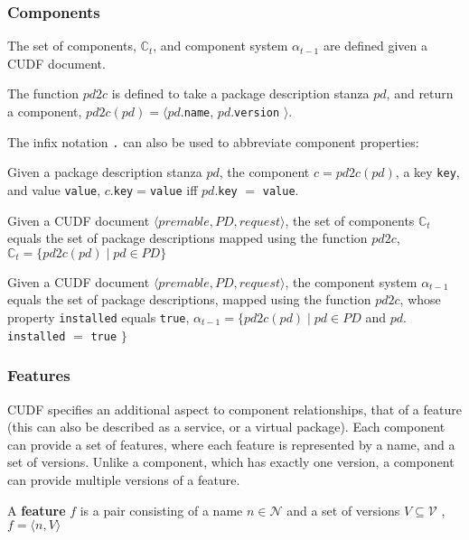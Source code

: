 \subsubsection{Components}
The set of components, $\mathbb{C}_t$, and component system $\alpha_{t-1}$ are defined given a CUDF document.

\begin{defs}
The function $pd2c$ is defined to take a package description stanza $pd$, and return a component, $pd2c(pd) = \langle pd.$\texttt{name}, $pd.$\texttt{version} $\rangle$.
\end{defs}

The infix notation \texttt{.} can also be used to abbreviate component properties: 
\begin{defs}
Given a package description stanza $pd$,  the component $c = pd2c(pd)$, a key \texttt{key}, and value \texttt{value}, 
$c$.\texttt{key}$ = $\texttt{value} iff $pd$.\texttt{key} $ = $ \texttt{value}.
\end{defs}

\begin{defs}
Given a CUDF document $\langle premable, PD, request \rangle$, the set of components $\mathbb{C}_t$ equals the set of package descriptions mapped using the function $pd2c$,
$\mathbb{C}_t = \{pd2c(pd) \mid pd \in PD\}$
\end{defs}

\begin{defs}
Given a CUDF document $\langle premable, PD, request \rangle$, the component system $\alpha_{t-1}$ equals the set of package descriptions, mapped using the function $pd2c$,
whose property \texttt{installed} equals \texttt{true},
$\alpha_{t-1} = \{pd2c(pd) \mid pd \in PD $ and $ pd.$\texttt{installed} $=$ \texttt{true} $\}$
\end{defs}

\subsubsection{Features}
CUDF specifies an additional aspect to component relationships, that of a feature (this can also be described as a service, or a virtual package).
Each component can provide a set of features, where each feature is represented by a name, and a set of versions.
Unlike a component, which has exactly one version, a component can provide multiple versions of a feature.

\begin{defs}
A \textbf{feature} $f$ is a pair consisting of a name $n \in \mathcal{N}$ and a set of versions $V \subseteq \mathcal{V}$ , 
$f = \langle n,V \rangle$
\end{defs}

